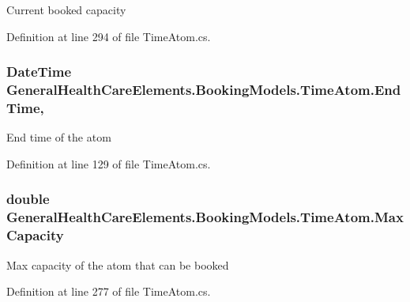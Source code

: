 Current booked capacity 



Definition at line 294 of file Time\+Atom.\+cs.

\subsubsection[{\texorpdfstring{End\+Time}{EndTime}}]{\setlength{\rightskip}{0pt plus 5cm}Date\+Time General\+Health\+Care\+Elements.\+Booking\+Models.\+Time\+Atom.\+End\+Time\hspace{0.3cm}{\ttfamily [get]}, {\ttfamily [set]}}\hypertarget{class_general_health_care_elements_1_1_booking_models_1_1_time_atom_ad6854233f39a11d2058392c6dbfb39de}{}\label{class_general_health_care_elements_1_1_booking_models_1_1_time_atom_ad6854233f39a11d2058392c6dbfb39de}


End time of the atom 



Definition at line 129 of file Time\+Atom.\+cs.

\subsubsection[{\texorpdfstring{Max\+Capacity}{MaxCapacity}}]{\setlength{\rightskip}{0pt plus 5cm}double General\+Health\+Care\+Elements.\+Booking\+Models.\+Time\+Atom.\+Max\+Capacity\hspace{0.3cm}{\ttfamily [get]}}\hypertarget{class_general_health_care_elements_1_1_booking_models_1_1_time_atom_adf15348042543f4626a1148e31083b99}{}\label{class_general_health_care_elements_1_1_booking_models_1_1_time_atom_adf15348042543f4626a1148e31083b99}


Max capacity of the atom that can be booked 



Definition at line 277 of file Time\+Atom.\+cs.

